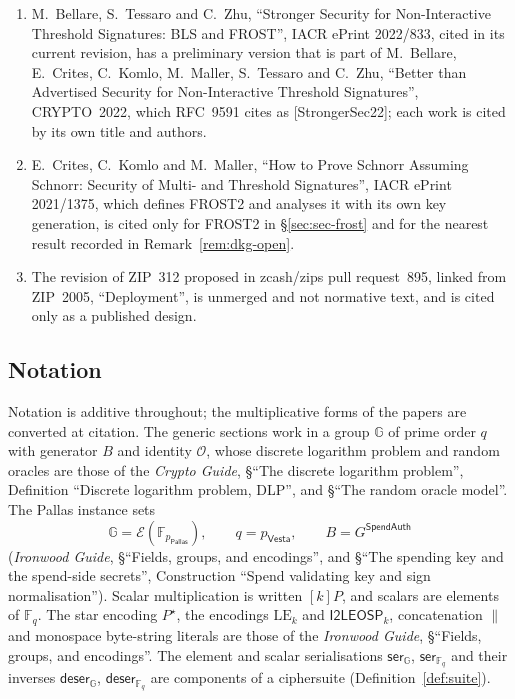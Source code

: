 \documentclass[11pt,a4paper]{article}
\theoremstyle{definition}
\newcommand{\F}{\mathbb{F}}
\newcommand{\G}{\mathbb{G}}
\newcommand{\Fq}{\F_q}
\newcommand{\Pallas}{\ensuremath{\mathsf{Pallas}}}
\newcommand{\Vesta}{\ensuremath{\mathsf{Vesta}}}
\newcommand{\Ep}{\ensuremath{\mathcal{E}}}
\begin{document}
\begin{enumerate}[label=(\alph*)]
  (LNCS~12804, pp.~34--65) and cited by RFC~9591 as [FROST20], gives the
  original scheme, its distributed key generation, in which every
  participant acts as a Feldman dealer and proves knowledge of its constant
  coefficient by a Schnorr proof (its Figure~1), and the original security
  argument.
\item M.~Bellare, S.~Tessaro and C.~Zhu, ``Stronger Security for
  Non-Interactive Threshold Signatures: BLS and FROST'', IACR ePrint
  2022/833, cited in its current revision, has a preliminary version that is
  part of M.~Bellare, E.~Crites, C.~Komlo, M.~Maller, S.~Tessaro and
  C.~Zhu, ``Better than Advertised Security for Non-Interactive Threshold
  Signatures'', CRYPTO~2022, which RFC~9591 cites as [StrongerSec22]; each
  work is cited by its own title and authors.
\item E.~Crites, C.~Komlo and M.~Maller, ``How to Prove Schnorr Assuming
  Schnorr: Security of Multi- and Threshold Signatures'', IACR ePrint
  2021/1375, which defines FROST2 and analyses it with its own key
  generation, is cited only for FROST2 in \S\ref{sec:sec-frost} and for the
  nearest result recorded in Remark~\ref{rem:dkg-open}.
\item The revision of ZIP~312 proposed in zcash/zips pull request~895,
  linked from ZIP~2005, ``Deployment'', is unmerged and not normative text,
  and is cited only as a published design.
\end{enumerate}

\subsection{Notation}\label{sec:intro-notation}

Notation is additive throughout; the multiplicative forms of the papers are
converted at citation. The generic sections work in a group \(\G\) of prime
order \(q\) with generator \(B\) and identity \(\mathcal{O}\), whose discrete
logarithm problem and random oracles are those of the \emph{Crypto Guide},
\S``The discrete logarithm problem'', Definition ``Discrete logarithm problem,
DLP'', and \S``The random oracle model''. The Pallas instance sets
\[
  \G = \Ep(\F_{p_{\Pallas}}), \qquad q = p_{\Vesta}, \qquad
  B = G^{\mathsf{SpendAuth}}
\]
(\emph{Ironwood Guide}, \S``Fields, groups, and encodings'', and
\S``The spending key and the spend-side secrets'', Construction ``Spend
validating key and sign normalisation''). Scalar multiplication is written
\([k]P\), and scalars are elements of \(\Fq\). The star encoding
\(P^{\star}\), the encodings \(\mathrm{LE}_k\) and \(\mathsf{I2LEOSP}_k\),
concatenation \(\|\) and monospace byte-string literals are those of the
\emph{Ironwood Guide}, \S``Fields, groups, and encodings''. The element and
scalar serialisations \(\mathsf{ser}_{\G}\), \(\mathsf{ser}_{\Fq}\) and their
inverses \(\mathsf{deser}_{\G}\), \(\mathsf{deser}_{\Fq}\) are components of
a ciphersuite (Definition~\ref{def:suite}).
\end{document}
